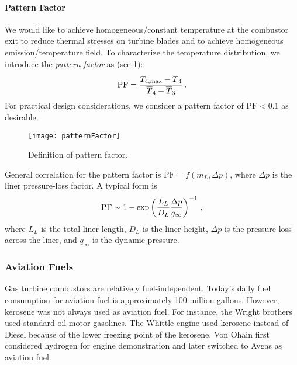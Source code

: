 \paragraph*{Pattern Factor}
We would like to achieve homogeneous/constant temperature at the combustor exit to reduce thermal stresses on turbine blades and to achieve homogeneous emission/temperature field. To characterize the temperature distribution, we introduce the {\it pattern factor} as (see \cref{FIG_PF_DEF}):
\begin{equation}
\text{PF} = {\frac{T_{4, \text{max}}-\overline{T}_4}{\overline{T}_4-\overline{T}_3}}\,.
\end{equation}
For practical design considerations, we consider a pattern factor of $\text{PF} < 0.1$ as desirable.

\begin{figure}[!htb!]
\begin{center}
  \texttt{[image: patternFactor]}
  \caption{\label{FIG_PF_DEF}Definition of pattern factor.}
\end{center}
\end{figure}

General correlation for the pattern factor is $\text{PF} = f(\dot{m}_L, \Delta p)$, where $\Delta p$ is the liner pressure-loss factor. A typical form is
\begin{equation}
  \text{PF} \sim 1 - \text{exp}\left({\frac{L_L}{D_L}} {\frac{\Delta p}{q_\infty}}\right)^{-1}\,,
\end{equation}
where $L_L$ is the total liner length, $D_L$ is the liner height, $\Delta p$ is the pressure loss across the liner, and $q_\infty$ is the dynamic pressure.

\subsubsection{Aviation Fuels}
Gas turbine combustors are relatively fuel-independent. Today's daily fuel consumption for aviation fuel is approximately 100 million gallons. However, kerosene was not always used as aviation fuel. For instance, the Wright brothers used standard oil motor gasolines. The Whittle engine used kerosene instead of Diesel because of the lower freezing point of the kerosene. Von Ohain first considered hydrogen for engine demonstration and later switched to Avgas as aviation fuel.

